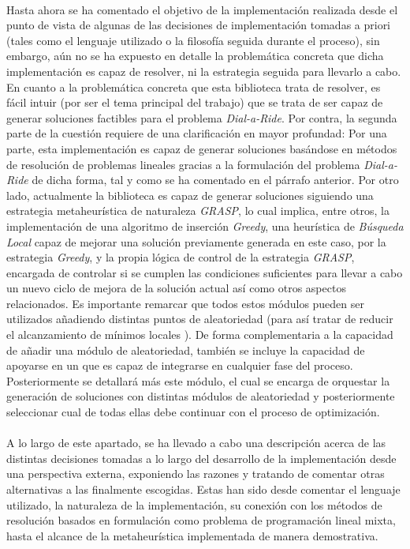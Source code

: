 \documentclass{subfiles}
\begin{document}
        \paragraph{}
        Hasta ahora se ha comentado el objetivo de la implementación realizada desde el punto de vista de algunas de las decisiones de implementación tomadas a priori (tales como el lenguaje utilizado o la filosofía seguida durante el proceso), sin embargo, aún no se ha expuesto en detalle la problemática concreta que dicha implementación es capaz de resolver, ni la estrategia seguida para llevarlo a cabo. En cuanto a la problemática concreta que esta biblioteca trata de resolver, es fácil intuir (por ser el tema principal del trabajo) que se trata de ser capaz de generar soluciones factibles para el problema \emph{Dial-a-Ride}. Por contra, la segunda parte de la cuestión requiere de una clarificación en mayor profundad: Por una parte, esta implementación es capaz de generar soluciones basándose en métodos de resolución de problemas lineales gracias a la formulación del problema \emph{Dial-a-Ride} de dicha forma, tal y como se ha comentado en el párrafo anterior. Por otro lado, actualmente la biblioteca es capaz de generar soluciones siguiendo una estrategia metaheurística de naturaleza \emph{GRASP}, lo cual implica, entre otros, la implementación de una algoritmo de inserción \emph{Greedy}, una heurística de \emph{Búsqueda Local} capaz de mejorar una solución previamente generada en este caso, por la estrategia \emph{Greedy}, y la propia lógica de control de la estrategia \emph{GRASP}, encargada de controlar si se cumplen las condiciones suficientes para llevar a cabo un nuevo ciclo de mejora de la solución actual así como otros aspectos relacionados. Es importante remarcar que todos estos módulos pueden ser utilizados añadiendo distintas puntos de aleatoriedad (para así tratar de reducir el alcanzamiento de mínimos locales ). De forma complementaria a la capacidad de añadir una módulo de aleatoriedad, también se incluye la capacidad de apoyarse en un  que es capaz de integrarse en cualquier fase del proceso. Posteriormente se detallará más este módulo, el cual se encarga de orquestar la generación de soluciones con distintas módulos de aleatoriedad y posteriormente seleccionar cual de todas ellas debe continuar con el proceso de optimización.

        \paragraph{}
        A lo largo de este apartado, se ha llevado a cabo una descripción acerca de las distintas decisiones tomadas a lo largo del desarrollo de la implementación desde una perspectiva externa, exponiendo las razones y tratando de comentar otras alternativas a las finalmente escogidas. Estas han sido desde comentar el lenguaje utilizado, la naturaleza de la implementación, su conexión con los métodos de resolución basados en formulación como problema de programación lineal mixta, hasta el alcance de la metaheurística implementada de manera demostrativa.
\end{document}

